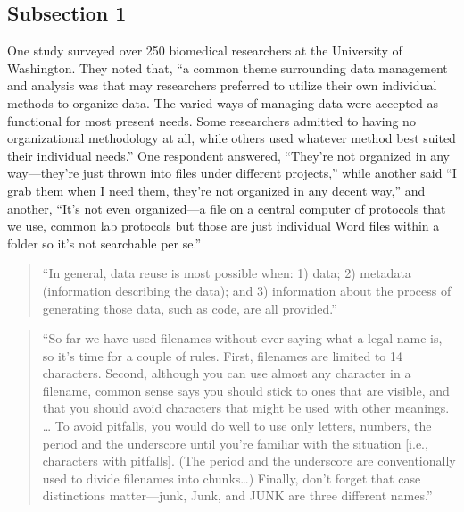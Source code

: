 \documentclass[]{tufte-book}
\begin{document}
\hypertarget{subsection-1}{%
\subsection{Subsection 1}\label{subsection-1}}

One study surveyed over 250 biomedical researchers at the University of Washington.
They noted that, ``a common theme surrounding data management and analysis was that
may researchers preferred to utilize their own individual methods to organize data.
The varied ways of managing data were accepted as functional for most present needs.
Some researchers admitted to having no organizational methodology at all, while others
used whatever method best suited their individual needs.'' \citep{anderson2007issues}
One respondent answered, ``They're not organized in any way---they're just thrown into
files under different projects,'' while another said ``I grab them when I need them, they're
not organized in any decent way,'' and another, ``It's not even organized---a file on a central
computer of protocols that we use, common lab protocols but those are just individual
Word files within a folder so it's not searchable per se.'' \citep{anderson2007issues}

\begin{quote}
``In general, data reuse is most possible when: 1) data; 2) metadata (information
describing the data); and 3) information about the process of generating those data,
such as code, are all provided.'' \citep{goodman2014ten}
\end{quote}

\begin{quote}
``So far we have used filenames without ever saying what a legal name is, so it's time for a couple
of rules. First, filenames are limited to 14 characters. Second, although you can use almost any
character in a filename, common sense says you should stick to ones that are visible, and that you
should avoid characters that might be used with other meanings. \ldots{} To avoid pitfalls, you would
do well to use only letters, numbers, the period and the underscore until you're familiar with the
situation {[}i.e., characters with pitfalls{]}. (The period and the underscore are conventionally used
to divide filenames into chunks\ldots) Finally, don't forget that case distinctions matter---junk, Junk,
and JUNK are three different names.'' \citep{kernighan1984unix}
\end{quote}
\end{document}

